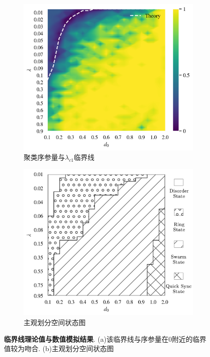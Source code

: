 \documentclass{article}
\begin{document}
\begin{figure}[H]
	\centering
	\begin{subfigure}[b]{0.49\textwidth}
		\includegraphics[width=\textwidth]{./figs/circleSwarmEdgesSync.png}
		\vspace{-1cm}
		\caption{聚类序参量与$\lambda_{c1}$临界线}
	\end{subfigure}
	\begin{subfigure}[b]{0.49\textwidth}
		\includegraphics[width=\textwidth]{./figs/subjectiveOp3.png}
		\vspace{-1cm}
		\caption{主观划分空间状态图}
	\end{subfigure}
	\caption{\small\textbf{临界线理论值与数值模拟结果}. (a)该临界线与序参量在0附近的临界值较为吻合. (b)主观划分空间状态图}
	\label{fig:fig23.3}
\end{figure}
\end{document}
